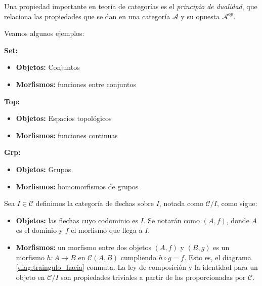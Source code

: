 Una propiedad importante en teoría de categorías es el \textit{principio de dualidad}, que relaciona las propiedades que se dan en una categoría $\mathscr{A}$ y su opuesta $\mathscr{A}^{op}$.

Veamos algunos ejemplos:

\begin{ejemplo}
    \textbf{Set: } 
    \begin{itemize}
        \item \textbf{Objetos: } Conjuntos
        \item \textbf{Morfismos: } funciones entre conjuntos
    \end{itemize}
\end{ejemplo}

\begin{ejemplo}
    \textbf{Top: } 
    \begin{itemize}
        \item \textbf{Objetos: } Espacios topológicos
        \item \textbf{Morfismos: } funciones continuas
    \end{itemize}
\end{ejemplo}

\begin{ejemplo}
    \textbf{Grp: } 
    \begin{itemize}
        \item \textbf{Objetos: } Grupos
        \item \textbf{Morfismos: } homomorfismos de grupos
    \end{itemize}
\end{ejemplo}

\begin{ejemplo}
    Sea $I \in \mathscr{C}$ definimos la categoría de flechas sobre $I$, notada como $\mathscr{C}/I$, como sigue:
    \begin{itemize}
        \item \textbf{Objetos: } las flechas cuyo codominio es $I$. Se notarán como $(A,f)$, donde $A$ es el dominio y $f$ el morfismo que llega a $I.$
        
        \item \textbf{Morfismos: } un morfismo entre dos objetos $(A,f)$ y $(B,g)$ es un morfismo $h: A \longrightarrow B$ en $\mathscr{C}(A,B)$ cumpliendo $h \circ g = f$. Esto es, el diagrama \ref{diag:traingulo_hacia} conmuta. La ley de composición y la identidad para un objeto en $\mathscr{C}/I$ son propiedades triviales a partir de las proporcionadas por $\mathscr{C}$.
    \end{itemize}
\end{ejemplo}

